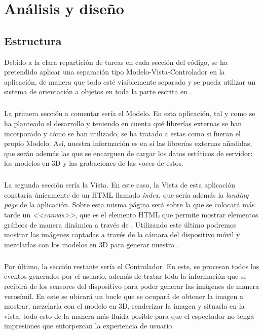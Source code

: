 \documentclass{subfiles}
\begin{document}
    \chapter{Análisis y diseño}
    \label{chap:analisis_y_diseno}

        \section{Estructura}
        \label{sec:estructura}
        Debido a la clara repartición de tareas en cada sección del código, se ha pretendido aplicar una separación tipo Modelo-Vista-Controlador en la aplicación, de manera que todo esté visiblemente separado y se pueda utilizar un sistema de orientación a objetos en toda la parte escrita en \js.

        \paragraph{}
        La primera sección a comentar sería el Modelo. En esta aplicación, tal y como se ha planteado el desarrollo y teniendo en cuenta qué librerías externas se han incorporado y cómo se han utilizado, se ha tratado a estas como si fueran el propio Modelo. Así, nuestra información es en sí las librerías externas añadidas, que serán además las que se encarguen de cargar los datos estáticos de servidor: los modelos en 3D y las grabaciones de las voces de estos.

        \paragraph{}
        La segunda sección sería la Vista. En este caso, la Vista de esta aplicación constaría únicamente de un HTML llamado \textit{index}, que sería además la \textit{landing page} de la aplicación. Sobre esta misma página será sobre la que se colocará más tarde un \textit{<<canvas>>}, que es el elemento HTML que permite mostrar elementos gráficos de manera dinámica a través de \js. Utilizando este último podremos mostrar las imágenes captadas a través de la cámara del dispositivo móvil y mezclarlas con los modelos en 3D para generar nuestra \ra.

        \paragraph{}
        Por último, la sección restante sería el Controlador. En este, se procesan todos los eventos generados por el usuario, además de tratar toda la información que se recibirá de los sensores del dispositivo para poder generar las imágenes de manera verosímil. En este se ubicará un bucle que se ocupará de obtener la imagen a mostrar, mezclarla con el modelo en 3D, renderizar la imagen y situarla en la vista, todo esto de la manera más fluida posible para que el espectador no tenga impresiones que entorpezcan la experiencia de usuario.
\end{document}
